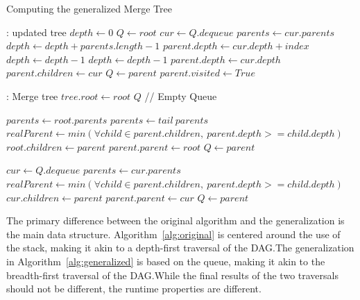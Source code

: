 \begin{algorithm}
  \caption{Computing the generalized Merge Tree}
  \label{alg:generalized}
  \begin{algorithmic}[1]
     : updated tree
    \State $depth \gets 0$
    \State $Q \gets root$
    \Do
    \State $cur \gets Q.dequeue$
    \State $parents \gets cur.parents$
    \State $depth \gets depth + parents.length - 1$
    \State $parent.depth \gets cur.depth + index$
    \State $depth \gets depth - 1$
    \State $depth \gets depth - 1$
    \State $parent.depth \gets cur.depth$
    \EndIf
    \State $parent.children \gets cur$
    \State $Q \gets parent$
    \State $parent.visited \gets True$
    \EndIf
    \EndFor
    \EndFunction

     : Merge tree
    \State $tree.root \gets root$
    \State $Q$ // Empty Queue

    \State $parents \gets root.parents$
    \State $parents \gets tail\ parents$
    \State $realParent \gets min(\forall child \in parent.children,\ parent.depth >= child.depth)$
    \State $root.children \gets parent$
    \State $parent.parent \gets root$
    \State $Q \gets parent$
    \EndIf
    \EndFor

    \State $cur \gets Q.dequeue$
    \State $parents \gets cur.parents$
    \State $realParent \gets min(\forall child \in parent.children,\ parent.depth >= child.depth)$
    \State $cur.children \gets parent$
    \State $parent.parent \gets cur$
    \State $Q \gets parent$
    \EndIf

    \EndFor
    \EndWhile

    \EndFunction
  \end{algorithmic}
\end{algorithm}

The primary difference between the original algorithm and the
generalization is the main data structure. Algorithm~\ref{alg:original}
is centered around the use of the stack, making it akin to a depth-first
traversal of the DAG.\@ The generalization in
Algorithm~\ref{alg:generalized} is based on the queue, making it akin to
the breadth-first traversal of the DAG.\@ While the final results of the
two traversals should not be different, the runtime properties are
different.

